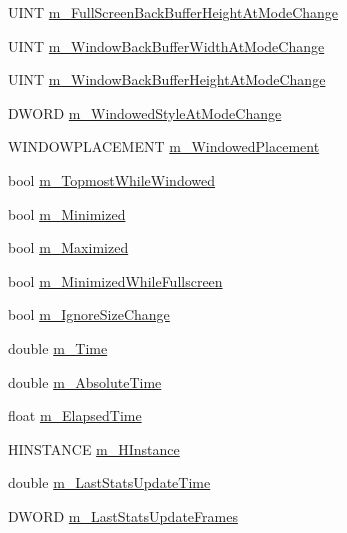 \begin{DoxyCompactItemize}
\item 
UINT \hyperlink{struct_d_x_u_t_state_1_1_s_t_a_t_e_a48f78e048e08a5bd3cf4a43efea95cd0}{m\_\-FullScreenBackBufferHeightAtModeChange}
\item 
UINT \hyperlink{struct_d_x_u_t_state_1_1_s_t_a_t_e_a047f50f98c491ef14122631b21a9658d}{m\_\-WindowBackBufferWidthAtModeChange}
\item 
UINT \hyperlink{struct_d_x_u_t_state_1_1_s_t_a_t_e_a15a6987343f6dff13d430cf4dc58cef1}{m\_\-WindowBackBufferHeightAtModeChange}
\item 
DWORD \hyperlink{struct_d_x_u_t_state_1_1_s_t_a_t_e_a87749bb43ec8abb327a2db7f7353f792}{m\_\-WindowedStyleAtModeChange}
\item 
WINDOWPLACEMENT \hyperlink{struct_d_x_u_t_state_1_1_s_t_a_t_e_ad309dfdf17c0d15b5b0e154b91074eb9}{m\_\-WindowedPlacement}
\item 
bool \hyperlink{struct_d_x_u_t_state_1_1_s_t_a_t_e_abff468d8377240a257516502604ba7d5}{m\_\-TopmostWhileWindowed}
\item 
bool \hyperlink{struct_d_x_u_t_state_1_1_s_t_a_t_e_a560104163c57157de77b7769feeff23e}{m\_\-Minimized}
\item 
bool \hyperlink{struct_d_x_u_t_state_1_1_s_t_a_t_e_a0528d57af4408b8bb0e541d70efffea9}{m\_\-Maximized}
\item 
bool \hyperlink{struct_d_x_u_t_state_1_1_s_t_a_t_e_a8ec3cca1de6739b0c1d78a702cc222fd}{m\_\-MinimizedWhileFullscreen}
\item 
bool \hyperlink{struct_d_x_u_t_state_1_1_s_t_a_t_e_a187c5678db2c966ceae453dcebc72d63}{m\_\-IgnoreSizeChange}
\item 
double \hyperlink{struct_d_x_u_t_state_1_1_s_t_a_t_e_ac76dfb119b4397d41056aa6a5392cb89}{m\_\-Time}
\item 
double \hyperlink{struct_d_x_u_t_state_1_1_s_t_a_t_e_a35148067e45d29d4b3c4ae62682ace0a}{m\_\-AbsoluteTime}
\item 
float \hyperlink{struct_d_x_u_t_state_1_1_s_t_a_t_e_a0cb84c7ba38794f349672253e93e1642}{m\_\-ElapsedTime}
\item 
HINSTANCE \hyperlink{struct_d_x_u_t_state_1_1_s_t_a_t_e_a7e4b3049d8ce242131d10ae6bf225825}{m\_\-HInstance}
\item 
double \hyperlink{struct_d_x_u_t_state_1_1_s_t_a_t_e_a7b004ce686d86fa27c8861ed837f9fed}{m\_\-LastStatsUpdateTime}
\item 
DWORD \hyperlink{struct_d_x_u_t_state_1_1_s_t_a_t_e_af2da3ea30f88e1495ada8b7fe913b698}{m\_\-LastStatsUpdateFrames}
\item 

\end{DoxyCompactItemize}
